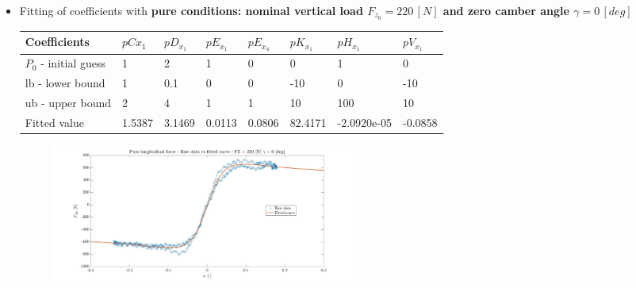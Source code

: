 \documentclass{IEEEtran}
\begin{document}
        \begin{itemize}
            \item Fitting of coefficients with \textbf{pure conditions: nominal vertical load $F_{z_0} = 220 \, [N]$ and zero camber angle $\gamma = 0 \, [deg]$ }\\
        
                \begin{table}[htpb]
                \begin{adjustbox}{width=\columnwidth,center}
                  
                    \begin{tabular}{|l|l|l|l|l|l|l|l|}
                    \hline
                    Coefficients       & $pC{x_1}$   & $pD_{x_1}$   & $pE_{x_1}$   & $pE_{x_4}$   & $pK_{x_1}$    & $pH_{x_1}$        & $pV_{x_1}$    \\ \hline
                    $P_0$ - initial guess & 1      & 2      & 1      & 0      & 0       & 1           & 0       \\ \hline
                    lb - lower bound   & 1      & 0.1    & 0      & 0      & -10     & 0           & -10     \\ \hline
                    ub - upper bound   & 2      & 4      & 1      & 1      & 10      & 100         & 10      \\ \hline
                    Fitted value       & 1.5387 & 3.1469 & 0.0113 & 0.0806 & 82.4171 & -2.0920e-05 & -0.0858 \\ \hline
                    \end{tabular}
                    
                    \end{adjustbox}
                \end{table}
    
                
                \begin{figure}[htbp]
                    \centerline{\includegraphics[width = 3.95in]{pure_longitudinal_1.jpg}}
                    
                    \label{fig:nominal conditions Fx0}
                \end{figure}
                

\end{itemize}
\end{document}
